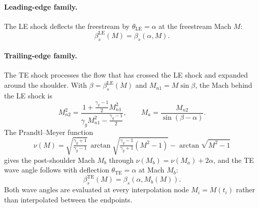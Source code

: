 \documentclass[11pt]{article}
\theoremstyle{remark}
\begin{document}
\paragraph{Leading-edge family.} The LE shock deflects the freestream by
$\theta_{\mathrm{LE}}=\alpha$ at the freestream Mach $M$:
\begin{equation}
\beta_s^{\mathrm{LE}}(M)=\beta_s(\alpha,M).
\end{equation}

\paragraph{Trailing-edge family.} The TE shock processes the flow that has
crossed the LE shock and expanded around the shoulder. With
$\beta=\beta_s^{\mathrm{LE}}(M)$ and $M_{n1}=M\sin\beta$, the Mach behind the LE
shock is
\begin{equation}
M_{n2}^2=\frac{1+\tfrac{\gamma_g-1}{2}M_{n1}^2}{\gamma_g M_{n1}^2-\tfrac{\gamma_g-1}{2}},
\qquad
M_a=\frac{M_{n2}}{\sin(\beta-\alpha)} .
\end{equation}
The Prandtl--Meyer function
\begin{equation}
\nu(M)=\sqrt{\tfrac{\gamma_g+1}{\gamma_g-1}}\,\arctan\!\sqrt{\tfrac{\gamma_g-1}{\gamma_g+1}(M^2-1)}-\arctan\!\sqrt{M^2-1}
\end{equation}
gives the post-shoulder Mach $M_b$ through $\nu(M_b)=\nu(M_a)+2\alpha$, and the TE
wave angle follows with deflection $\theta_{\mathrm{TE}}=\alpha$ at Mach $M_b$:
\begin{equation}
\beta_s^{\mathrm{TE}}(M)=\beta_s(\alpha,M_b(M)).
\end{equation}
Both wave angles are evaluated at every interpolation node $M_i=M(t_i)$ rather
than interpolated between the endpoints.
\end{document}

